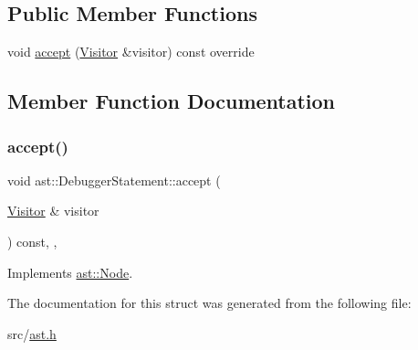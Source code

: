 \subsection*{Public Member Functions}
\begin{DoxyCompactItemize}
\item 
void \hyperlink{structast_1_1_debugger_statement_a804fde650cdb57afd2c11b8f466f3af0}{accept} (\hyperlink{structast_1_1_visitor}{Visitor} \&visitor) const override
\end{DoxyCompactItemize}


\subsection{Member Function Documentation}
\mbox{\label{structast_1_1_debugger_statement_a804fde650cdb57afd2c11b8f466f3af0}} 
\subsubsection{\texorpdfstring{accept()}{accept()}}
{\footnotesize\ttfamily void ast\+::\+Debugger\+Statement\+::accept (\begin{DoxyParamCaption}\item[{\hyperlink{structast_1_1_visitor}{Visitor} \&}]{visitor }\end{DoxyParamCaption}) const\hspace{0.3cm}{\ttfamily [inline]}, {\ttfamily [override]}, {\ttfamily [virtual]}}



Implements \hyperlink{structast_1_1_node_abc089ee6caaf06a4445ebdd8391fdebc}{ast\+::\+Node}.



The documentation for this struct was generated from the following file\+:\begin{DoxyCompactItemize}
\item 
src/\hyperlink{ast_8h}{ast.\+h}\end{DoxyCompactItemize}
